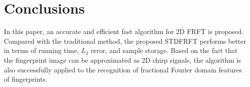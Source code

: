 \documentclass[conference]{IEEEtran}
\begin{document}


\section{Conclusions}
In this paper, an accurate and efficient fast algorithm for 2D FRFT is proposed. Compared with the traditional method, the proposed STDFRFT performs better in terms of running time, $L_2$ error, and sample storage. Based on the fact that the fingerprint image can be approximated as 2D chirp signals, the algorithm is also successfully applied to the recognition of fractional Fourier domain features of fingerprints.

\end{document}
